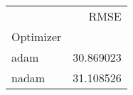 \begin{tabular}{lr}
 & RMSE \\
Optimizer &  \\
adam & 30.869023 \\
nadam & 31.108526 \\
\end{tabular}
